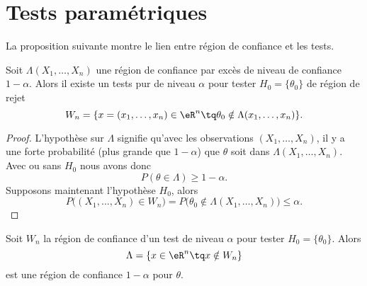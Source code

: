 \section{Tests paramétriques}

La proposition suivante montre le lien entre région de confiance et les tests.
\begin{proposition}
	Soit \( \Lambda(X_1,\ldots, X_n)\) une région de confiance par excès de niveau de confiance \( 1-\alpha\). Alors il existe un tests pur de niveau \( \alpha\) pour tester \( H_0=\{ \theta_0 \}\) de région de rejet
	\begin{equation}
		W_n=\{ x=(x_1,\ldots,x_n)\in \eR^n\tq \theta_0\notin\Lambda(x_1,\ldots,x_n) \}.
	\end{equation}
\end{proposition}

\begin{proof}
	L'hypothèse sur \( \Lambda\) signifie qu'avec les observations \( (X_1,\ldots, X_n)\), il y a une forte probabilité (plus grande que \( 1-\alpha\)) que \( \theta\) soit dans \( \Lambda(X_1,\ldots, X_n)\). Avec ou sans \( H_0\) nous avons donc
	\begin{equation}
		P(\theta\in\Lambda)\geq 1-\alpha.
	\end{equation}
	Supposons maintenant l'hypothèse \( H_0\), alors
	\begin{equation}
		P\big( (X_1,\ldots, X_n)\in W_n \big)=P\big( \theta_0\notin\Lambda(X_1,\ldots, X_n) \big)\leq \alpha.
	\end{equation}
\end{proof}

\begin{remark}
	Soit \( W_n\) la région de confiance d'un test de niveau \( \alpha\) pour tester \( H_0=\{ \theta_0 \}\). Alors
	\begin{equation}
		\Lambda=\{ x\in\eR^n\tq x\notin W_n \}
	\end{equation}
	est une région de confiance \( 1-\alpha\) pour \( \theta\).
\end{remark}


